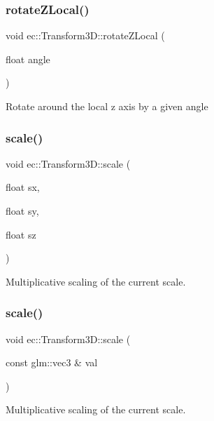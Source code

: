 \subsubsection{\texorpdfstring{rotate\+Z\+Local()}{rotateZLocal()}}
{\footnotesize\ttfamily void ec\+::\+Transform3\+D\+::rotate\+Z\+Local (\begin{DoxyParamCaption}\item[{float}]{angle }\end{DoxyParamCaption})}

Rotate around the local z axis by a given angle \mbox{\label{classec_1_1_transform3_d_a3f4636cea71bac0aa965bc567e649e03}} 
\subsubsection{\texorpdfstring{scale()}{scale()}\hspace{0.1cm}{\footnotesize\ttfamily [1/2]}}
{\footnotesize\ttfamily void ec\+::\+Transform3\+D\+::scale (\begin{DoxyParamCaption}\item[{float}]{sx,  }\item[{float}]{sy,  }\item[{float}]{sz }\end{DoxyParamCaption})}

Multiplicative scaling of the current scale. \mbox{\label{classec_1_1_transform3_d_a5ddb66479416948acf2406f544aaaa0f}} 
\subsubsection{\texorpdfstring{scale()}{scale()}\hspace{0.1cm}{\footnotesize\ttfamily [2/2]}}
{\footnotesize\ttfamily void ec\+::\+Transform3\+D\+::scale (\begin{DoxyParamCaption}\item[{const glm\+::vec3 \&}]{val }\end{DoxyParamCaption})}

Multiplicative scaling of the current scale. \mbox{\label{classec_1_1_transform3_d_a3b859bc4f4b47e9d4b1e322c811a9e29}} 
